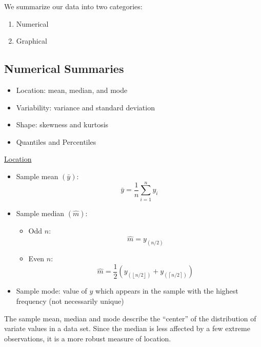 We summarize our data into two categories:
\begin{enumerate}[label=(\arabic*)]
    \item Numerical
    \item Graphical
\end{enumerate}

\subsection{Numerical Summaries}

\begin{itemize}
    \item Location: mean, median, and mode
    \item Variability: variance and standard deviation
    \item Shape: skewness and kurtosis
    \item Quantiles and Percentiles
\end{itemize}

\underline{Location}
\begin{itemize}
    \item Sample mean $ \left( \bar{y} \right) $:
          \[ \bar{y}=\frac{1}{n} \sum_{i=1}^{n} y_{i} \]
    \item Sample median $ \left( \hat{m} \right) $:
          \begin{itemize}
              \item Odd $ n $:
                    \[ \hat{m}=y_{\left(n/2\right)} \]
              \item Even $ n $:
                    \[ \hat{m}=\frac{1}{2} \left( y_{\left(\left\lfloor n/2\right\rfloor\right)} +
                        y_{\left(\left\lceil n/2\right\rceil\right)}\right) \]
          \end{itemize}
    \item Sample mode: value of $ y $ which appears in the sample with the highest frequency
          (not necessarily unique)
\end{itemize}
The sample mean, median and mode describe the ``center'' of the distribution
of variate values in a data set. Since the median is less affected by a few extreme
observations, it is a more robust measure of location.


